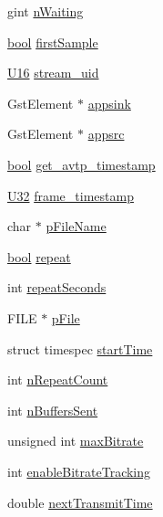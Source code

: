 \begin{DoxyCompactItemize}
gint \hyperlink{structpvt__data__t_a8f3382ecb9f43a47a26e41407422d27b}{n\+Waiting}
\item 
\hyperlink{avb__gptp_8h_af6a258d8f3ee5206d682d799316314b1}{bool} \hyperlink{structpvt__data__t_a21d4df265c73842b0fc81b13685214cd}{first\+Sample}
\item 
\hyperlink{openavb__types__base__pub_8h_a0a0a322d5fa4a546d293a77ba8b4a71f}{U16} \hyperlink{structpvt__data__t_a511b2a26fe61b945ced1dd0bab9f2d1b}{stream\+\_\+uid}
\item 
Gst\+Element $\ast$ \hyperlink{structpvt__data__t_acb9960605ecf9f62aa5508bde953b464}{appsink}
\item 
Gst\+Element $\ast$ \hyperlink{structpvt__data__t_a512e4f21f7a4f8ec5f1c52c6f1954348}{appsrc}
\item 
\hyperlink{avb__gptp_8h_af6a258d8f3ee5206d682d799316314b1}{bool} \hyperlink{structpvt__data__t_ae0d64a11bd4a819ee73a35df3c401427}{get\+\_\+avtp\+\_\+timestamp}
\item 
\hyperlink{openavb__types__base__pub_8h_a696390429f2f3b644bde8d0322a24124}{U32} \hyperlink{structpvt__data__t_a03f4a6b3e8357d3fb09d29d6c42e4c19}{frame\+\_\+timestamp}
\item 
char $\ast$ \hyperlink{structpvt__data__t_aea3ef612729c0b5f248724edfeba8eb0}{p\+File\+Name}
\item 
\hyperlink{avb__gptp_8h_af6a258d8f3ee5206d682d799316314b1}{bool} \hyperlink{structpvt__data__t_a98c61ed9410ab805baab005fe7713d9b}{repeat}
\item 
int \hyperlink{structpvt__data__t_ab5e342262ddb476fbecf6d61dabc12b4}{repeat\+Seconds}
\item 
F\+I\+LE $\ast$ \hyperlink{structpvt__data__t_a5dcda7b55c4989de3c64d44e708672f1}{p\+File}
\item 
struct timespec \hyperlink{structpvt__data__t_ae2cc326427cdc63f9673b87edb83036c}{start\+Time}
\item 
int \hyperlink{structpvt__data__t_a36a4dcc2e7a27fe7dbde9f09a0cc53dc}{n\+Repeat\+Count}
\item 
int \hyperlink{structpvt__data__t_aca1546342cf15dde023a7e9fbda1366e}{n\+Buffers\+Sent}
\item 
unsigned int \hyperlink{structpvt__data__t_a8accc418990c1c1c9eafd020a474e026}{max\+Bitrate}
\item 
int \hyperlink{structpvt__data__t_a0244b24ce315ab79c661e280c86933c2}{enable\+Bitrate\+Tracking}
\item 
double \hyperlink{structpvt__data__t_a29614099200d849756097092eb31e084}{next\+Transmit\+Time}

\end{DoxyCompactItemize}
